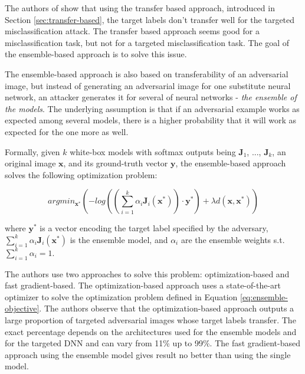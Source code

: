 The authors of \cite{ensemble-attack} show that using the transfer based approach, introduced in Section \ref{sec:transfer-based}, the target labels don't transfer well for the targeted misclassification attack. The transfer based approach seems good for a misclassification task, but not for a targeted misclassification task. The goal of the ensemble-based approach is to solve this issue.

The ensemble-based approach is also based on transferability of an adversarial image, but instead of generating an adversarial image for one substitute neural network, an attacker generates it for several of neural networks - \textit{the ensemble of the models}. The underlying assumption is that if an adversarial example works as expected among several models, there is a higher probability that it will work as expected for the one more as well. 

Formally, given $k$ white-box models with softmax outputs being $\pmb J_1$, ..., $\pmb J_k$, an original image $\pmb x$, and its ground-truth vector $\pmb y$, the ensemble-based approach solves the following optimization problem:

\begin{equation}\label{eq:ensemble-objective}
argmin_{\pmb x^*} (- log ((\sum_{i=1}^k \alpha_i \pmb J_i(\pmb x^*)) \cdot \pmb y^*) + \lambda d(\pmb x, \pmb x^*))
\end{equation}

where $\pmb y^*$ is a vector encoding the target label specified by the adversary, $\sum_{i=1}^k \alpha_i \pmb J_i(\pmb x^*)$ is the ensemble model, and $\alpha_i$ are the ensemble weights s.t. $\sum_{i=1}^k \alpha_i = 1$.

The authors use two approaches to solve this problem: optimization-based and fast gradient-based. The optimization-based approach uses a state-of-the-art optimizer to solve the optimization problem defined in Equation \ref{eq:ensemble-objective}. The authors observe that the optimization-based approach outputs a large proportion of targeted adversarial images whose target labels transfer. The exact percentage depends on the architectures used for the ensemble models and for the targeted DNN and can vary from 11\% up to 99\%. The fast gradient-based approach using the ensemble model gives result no better than using the single model.